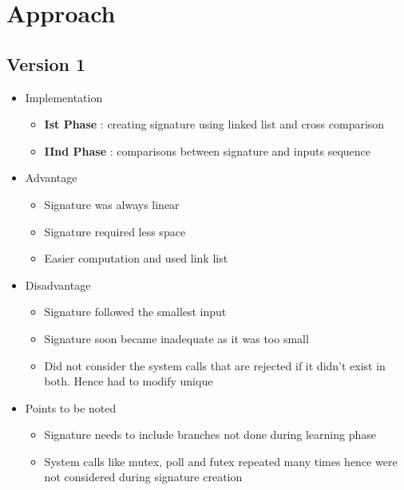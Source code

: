 \section{Approach}
\subsection{Version 1}
\begin{itemize}
    \item[] Implementation 
        \begin{itemize}
            \item[] \textbf{Ist Phase} : creating signature using linked list and cross comparison
            \item[] \textbf{IInd Phase} : comparisons between signature and inputs sequence
        \end{itemize}
    \item[] {Advantage}
        \begin{itemize}
            \item[] Signature was always linear
            \item[] Signature required less space
            \item[] Easier computation and used link list
        \end{itemize}
    \item[] {Disadvantage}
        \begin{itemize}
            \item[] Signature followed the smallest input
            \item[] Signature soon became inadequate as it was too small
            \item[] Did not consider the system calls that are rejected if it didn't exist in both. Hence had to modify unique
        \end{itemize}
    \item[] {Points to be noted}
        \begin{itemize}
            \item[] Signature needs to include branches not done during learning phase
            \item[] System calls like mutex, poll and futex repeated many times hence were not considered during signature creation
        \end{itemize}
\end{itemize}
